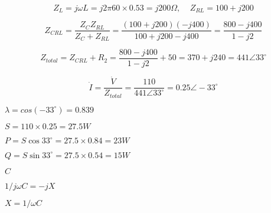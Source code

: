 {\newpage\clearpage
{}%
\begin{displaymath}Z_L=j\omega L=j 2\pi 60\times 0.53=j200\Omega,\;\;\;\; Z_{RL}=100+j200\end{displaymath}%
\lthtmldisplayZ
\lthtmlcheckvsize\clearpage}

{\newpage\clearpage
{}%
\begin{displaymath} Z_{CRL}=\frac{Z_C Z_{RL}}{Z_C+Z_{RL}}=\frac{(100+j200)(-j400)}{100+j200-j400}
  	=\frac{800-j400}{1-j2}	\end{displaymath}%
\lthtmldisplayZ
\lthtmlcheckvsize\clearpage}

{\newpage\clearpage
{}%
\begin{displaymath}
  Z_{total}=Z_{CRL}+R_2=\frac{800-j400}{1-j2}+50=370+j240=441\angle 33^\circ
  \end{displaymath}%
\lthtmldisplayZ
\lthtmlcheckvsize\clearpage}

{\newpage\clearpage
{}%
\begin{displaymath} \dot{I}=\frac{\dot{V}}{Z_{total}}=\frac{110}{441\angle 33^\circ}
  	=0.25\angle -33^\circ	\end{displaymath}%
\lthtmldisplayZ
\lthtmlcheckvsize\clearpage}

{\newpage\clearpage
{}%
$\lambda=cos (-33^\circ)=0.839$%
\lthtmlinlinemathZ
\lthtmlcheckvsize\clearpage}

{\newpage\clearpage
{}%
$S=110\times 0.25=27.5 W$%
\lthtmlinlinemathZ
\lthtmlcheckvsize\clearpage}

{\newpage\clearpage
{}%
$P=S \cos 33^\circ=27.5\times 0.84=23 W$%
\lthtmlinlinemathZ
\lthtmlcheckvsize\clearpage}

{\newpage\clearpage
{}%
$Q=S \sin 33^\circ=27.5\times 0.54=15 W$%
\lthtmlinlinemathZ
\lthtmlcheckvsize\clearpage}

{\newpage\clearpage
{}%
$C$%
\lthtmlinlinemathZ
\lthtmlcheckvsize\clearpage}

{\newpage\clearpage
{}%
$1/j\omega C=-jX$%
\lthtmlinlinemathZ
\lthtmlcheckvsize\clearpage}

{\newpage\clearpage
{}%
$X=1/\omega C$%
\lthtmlinlinemathZ
\lthtmlcheckvsize\clearpage}

